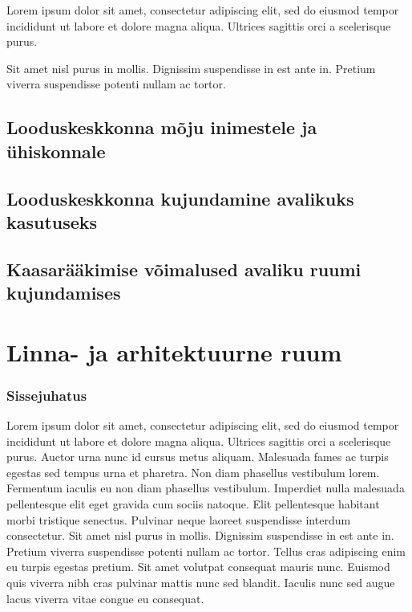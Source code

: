 \documentclass[]{book}
\begin{document}
\begin{blockquote}
Lorem ipsum dolor sit amet, consectetur adipiscing elit, sed do eiusmod
tempor incididunt ut labore et dolore magna aliqua. Ultrices sagittis
orci a scelerisque purus.
\end{blockquote}

Sit amet nisl purus in mollis. Dignissim suspendisse in est ante in. Pretium viverra suspendisse potenti nullam ac tortor.

\hypertarget{chapter32}{%
\section{Looduskeskkonna mõju inimestele ja ühiskonnale}\label{chapter32}}

\hypertarget{chapter33}{%
\section{Looduskeskkonna kujundamine avalikuks kasutuseks}\label{chapter33}}

\hypertarget{chapter34}{%
\section{Kaasarääkimise võimalused avaliku ruumi kujundamises}\label{chapter34}}

\hypertarget{chapter40}{%
\chapter{Linna- ja arhitektuurne ruum}\label{chapter40}}

\hypertarget{sissejuhatus-3}{%
\subsection*{Sissejuhatus}\label{sissejuhatus-3}}

Lorem ipsum dolor sit amet, consectetur adipiscing elit, sed do eiusmod tempor incididunt ut labore et dolore magna aliqua. Ultrices sagittis orci a scelerisque purus. Auctor urna nunc id cursus metus aliquam. Malesuada fames ac turpis egestas sed tempus urna et pharetra. Non diam phasellus vestibulum lorem. Fermentum iaculis eu non diam phasellus vestibulum. Imperdiet nulla malesuada pellentesque elit eget gravida cum sociis natoque. Elit pellentesque habitant morbi tristique senectus. Pulvinar neque laoreet suspendisse interdum consectetur. Sit amet nisl purus in mollis. Dignissim suspendisse in est ante in. Pretium viverra suspendisse potenti nullam ac tortor. Tellus cras adipiscing enim eu turpis egestas pretium. Sit amet volutpat consequat mauris nunc. Euismod quis viverra nibh cras pulvinar mattis nunc sed blandit. Iaculis nunc sed augue lacus viverra vitae congue eu consequat.
\end{document}
